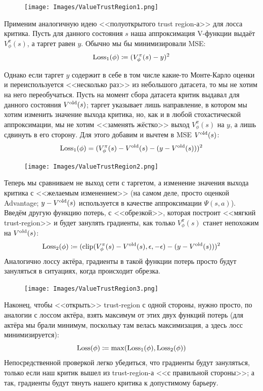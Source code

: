 \begin{figure}
\vspace{-0.5cm}
\centering
\texttt{[image: Images/ValueTrustRegion1.png]}
\end{figure}
Применим аналогичную идею <<полуоткрытого trust region-а>> для лосса критика. Пусть для данного состояния $s$ наша аппроксимация V-функции выдаёт $V^{\pi}_{\phi}(s)$, а таргет равен $y$. Обычно мы бы минимизировали MSE:
$$\operatorname{Loss}_1(\phi) \coloneqq (V^{\pi}_{\phi}(s) - y)^2$$

Однако если таргет $y$ содержит в себе в том числе какие-то Монте-Карло оценки и переиспользуется <<несколько раз>> из небольшого датасета, то мы не хотим на него переобучаться. Пусть на момент сбора датасета критик выдавал для данного состояния $V^{\mathrm{old}}(s)$; таргет указывает лишь направление, в котором мы хотим изменить значение выхода критика, но, как и в любой стохастической аппроксимации, мы не хотим <<заменять жёстко>> выход $V^{\pi}_{\phi}(s)$ на $y$, а лишь сдвинуть в его сторону. Для этого добавим и вычтем в MSE $V^{\mathrm{old}}(s)$:
$$\operatorname{Loss}_1(\phi) = (V^{\pi}_{\phi}(s) - V^{\mathrm{old}}(s) - (y - V^{\mathrm{old}}(s)))^2$$

\begin{figure}
\centering
\texttt{[image: Images/ValueTrustRegion2.png]}
\end{figure}
Теперь мы сравниваем не выход сети с таргетом, а изменение значения выхода критика с <<желаемым изменением>> (на самом деле, просто оценкой Advantage; $y - V^{\mathrm{old}}(s)$ используется в качестве аппроксимации $\Psi(s, a)$). Введём другую функцию потерь, с <<обрезкой>>, которая построит <<мягкий trust-region>> и будет занулять градиенты, как только $V^{\pi}_{\phi}(s)$ станет непохожим на $V^{\mathrm{old}}(s)$:
$$\operatorname{Loss}_2(\phi) \coloneqq (\mathrm{clip}(V^{\pi}_{\phi}(s) - V^{\mathrm{old}}(s), \epsilon, -\epsilon) - (y - V^{\mathrm{old}}(s)))^2$$
Аналогично лоссу актёра, градиенты в такой функции потерь просто будут зануляться в ситуациях, когда происходит обрезка.

\begin{figure}
\vspace{-0.7cm}
\centering
\texttt{[image: Images/ValueTrustRegion3.png]}
\end{figure}
Наконец, чтобы <<открыть>> trust-region с одной стороны, нужно просто, по аналогии с лоссом актёра, взять максимум от этих двух функций потерь (для актёра мы брали минимум, поскольку там велась максимизация, а здесь лосс минимизируется):
$$\operatorname{Loss}(\phi) \coloneqq \max(\operatorname{Loss}_1(\phi), \operatorname{Loss}_2(\phi))$$
Непосредственной проверкой легко убедиться, что градиенты будут зануляться, только если наш критик вышел из trust-region-а <<с правильной стороны>>; а так, градиенты будут тянуть нашего критика к допустимому барьеру.

